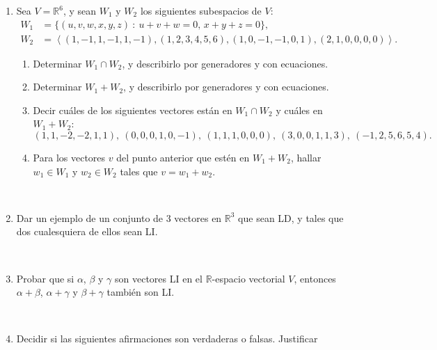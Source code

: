 \documentclass[12pt]{amsart}
\begin{document}
\begin{enumerate}
	\begin{enumerate}
    \item Sean $W_1$ y $W_2$ los espacios soluci{\'o}n de los sistemas
	homog{\'e}neos asociados a $A_1$ y $A_2$, respectivamente.  Describir impl{\'\i}citamente $W_1\cap W_2$.
	\item Sean $V_1$ y $V_2$ los subespacios de $\mathbb{R}^5$ generado por las filas de $A_1$ y $A_2$, respectivamente. Dar un conjunto de generadores de $V_1+V_2$.
	\end{enumerate}



\
	
\item\label{todo} Sea $V=\mathbb{R}^6$, y sean $W_1$ y $W_2$ los siguientes subespacios de $V$:
	\begin{align*}
	W_1 &= \{ (u,v,w,x,y,z)\ : \ u+v+w=0,\, x+y+z=0\},  \\
	W_2 &= \left\langle{(1,-1,1,-1,1,-1),(1,2,3,4,5,6),(1,0,-1,-1,0,1),(2,1,0,0,0,0)}\right\rangle.
	\end{align*}
	\begin{enumerate}
		\item  Determinar $W_1 \cap W_2$, y describirlo por generadores y con ecuaciones.
		\item  Determinar $W_1+W_2$, y describirlo por generadores y con ecuaciones.
		\item  Decir cu\'ales de los siguientes vectores est\'an en $W_1\cap W_2$ y cu\'ales en $W_1+W_2$:
		\[ (1,1,-2,-2,1,1),\ (0,0,0,1,0,-1),\ (1,1,1,0,0,0),\ (3,0,0,1,1,3),\ (-1,2,5,6,5,4). \]
		\item Para los vectores $v$ del punto anterior que est\' en en $W_1+W_2$,  hallar $w_1\in W_1$ y $w_2\in W_2$ tales que $v=w_1+w_2$.
	\end{enumerate}

\

\item Dar un ejemplo de un conjunto de 3 vectores en $\mathbb{R}^3$ que sean LD, y tales que dos cualesquiera de ellos sean LI.

\

\item  Probar que si $\alpha$, $\beta$ y $\gamma$ son vectores LI en el $\mathbb{R}$-espacio vectorial $V$, entonces $\alpha +\beta$, $\alpha +\gamma$ y $\beta +\gamma $ tambi\'en son LI.

\

\item Decidir si las siguientes afirmaciones son verdaderas o falsas. Justificar


\end{enumerate}
\end{document}
